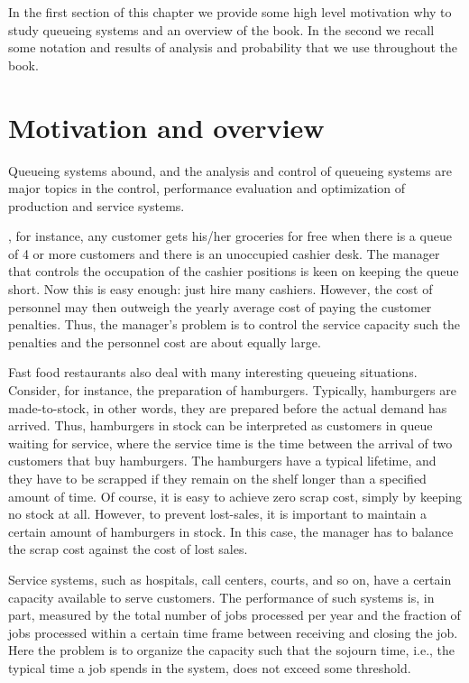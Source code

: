 \documentclass[queueing-book.tex]{subfiles}
\begin{document}
In the first section of this chapter we provide some high level motivation why to study queueing systems and an overview of the book. In the second we recall some notation and results of analysis and probability that we use throughout the book.

\section{Motivation and overview}
\label{sec:motivation-overview}

Queueing systems abound, and the analysis and control of queueing systems are major topics in the control, performance evaluation and optimization of production and service systems.


, for instance, any customer gets his/her groceries for free when there is a queue of 4 or more customers and there is an unoccupied cashier desk.
The manager that controls the occupation of the cashier positions is keen on keeping the queue short.
Now this is easy enough: just hire many cashiers. However, the cost of personnel may then outweigh the yearly average cost of paying the customer penalties.
Thus, the manager's problem is to control the service capacity such the penalties and the personnel cost are about equally large.

Fast food restaurants also deal with many interesting queueing situations.
Consider, for instance, the preparation of hamburgers.
Typically, hamburgers are made-to-stock, in other words, they are prepared before the actual demand has arrived.
Thus, hamburgers in stock can be interpreted as customers in queue waiting for service, where the service time is the time between the arrival of two customers that buy hamburgers.
The hamburgers have a typical lifetime, and they have to be scrapped if they remain on the shelf longer than a specified amount of time.
Of course, it is easy to achieve zero scrap cost, simply by keeping no stock at all.
However, to prevent lost-sales, it is important to maintain a certain amount of hamburgers in stock.
In this case, the manager has to balance the scrap cost against the cost of lost sales.

Service systems, such as hospitals, call centers, courts, and so on, have a certain capacity available to serve customers.
The performance of such systems is, in part, measured by the total number of jobs processed per year and the fraction of jobs processed within a certain time frame between receiving and closing the job.
Here the problem is to organize the capacity such that the sojourn time, i.e., the typical time a job spends in the system, does not exceed some threshold.
\end{document}
